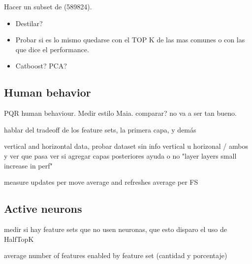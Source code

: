 Hacer un subset de  (589824).

\begin{itemize}
\item Destilar?
\item Probar si es lo mismo quedarse con el TOP K de las mas comunes o con las que dice el performance.
\item Catboost? PCA?
\end{itemize}

\subsection{Human behavior}

PQR human behaviour. Medir estilo Maia. comparar? no va a ser tan bueno.




hablar del tradeoff de los feature sets, la primera capa, y demás

vertical and horizontal data, probar dataset sin info vertical u horizonal / ambos y ver que pasa
ver si agregar capas posteriores ayuda o no "layer layers small increase in perf"

measure updates per move average and refreshes average per FS



\subsection{Active neurons}

medir si hay feature sets que no usen neuronas, que esto disparo el uso de HalfTopK

average number of features enabled by feature set (cantidad y porcentaje)



